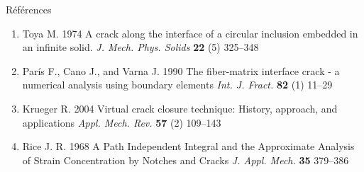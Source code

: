 \documentclass[final]{beamer}
\begin{document}
\begin{frame}
\begin{center}
\begin{minipage}{\textwidth}
\begin{columns}[totalwidth=0.925\textwidth]
\begin{column}{0.5\textwidth}
\begin{block}{\rule[-0.6ex]{0pt}{50pt}\centering R\'ef\'erences}
\begin{enumerate}
\item[{[}4{]}] Toya M. 1974 A crack along the interface of a circular inclusion embedded in an infinite solid. {\it \tiny J. Mech. Phys. Solids} {\bf \tiny 22} (5) 325--348
\item[{[}5{]}] Par\'is F., Cano J., and Varna J. 1990 The fiber-matrix interface crack - a numerical analysis using boundary elements {\it \tiny  Int. J. Fract.} {\bf \tiny 82} (1) 11--29
\item[{[}6{]}] Krueger R. 2004 Virtual crack closure technique: History, approach, and applications {\it\tiny Appl. Mech. Rev.} {\bf\tiny 57} (2) 109--143
\item[{[}7{]}] Rice J. R. 1968 A Path Independent Integral and the Approximate Analysis of Strain Concentration by Notches and Cracks {\it\tiny J. Appl. Mech.} {\bf\tiny 35} 379--386
\end{enumerate}
\end{block}
\end{column}
\end{columns}
\end{minipage}
\end{center}

\end{frame}
\end{document}
